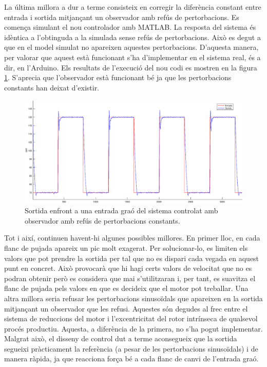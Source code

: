 \documentclass[]{article}
\begin{document}
La última millora a dur a terme consisteix en corregir la diferència constant entre entrada i sortida mitjançant un observador amb refús de pertorbacions. Es comença simulant el nou controlador amb MATLAB. La resposta del sistema és idèntica a l'obtinguda a la simulada sense refús de pertorbacions. Això es degut a que en el model simulat no apareixen aquestes pertorbacions. D'aquesta manera, per valorar que aquest està funcionant s'ha d'implementar en el sistema real, és a dir, en l'Arduino. Els resultats de l'execució del nou codi es mostren en la figura \ref{fig:observador_pertorbacions}. S'aprecia que l'observador està funcionant bé ja que les pertorbacions constants han deixat d'existir. 

\begin{figure}[H]
\centering
	\includegraphics[width = .8\linewidth]{images/Entrada_Sortida_Refus_Constant.eps}
	\caption{Sortida enfront a una entrada graó del sistema controlat amb observador amb refús de pertorbacions constants.}
	\label{fig:observador_pertorbacions}
\end{figure}

Tot i així, continuen havent-hi algunes possibles millores. En primer lloc, en cada flanc de pujada apareix un pic molt exagerat. Per solucionar-lo, es limiten els valors que pot prendre la sortida per tal que no es dispari cada vegada en aquest punt en concret. Això provocarà que hi hagi certs valors de velocitat que no es podran obtenir però es considera que mai s'utilitzaran i, per tant, es suavitza el flanc de pujada pels valors en que es decideix que el motor pot treballar. Una altra millora seria refusar les pertorbacions sinusoïdals que apareixen en la sortida mitjançant un observador que les refusi. Aquestes són degudes al frec entre el sistema de reduccions del motor i l'excentricitat del rotor intrínseca de qualsevol procés productiu. Aquesta, a diferència de la primera, no s'ha pogut implementar. Malgrat això, el disseny de control dut a terme aconsegueix que la sortida segueixi pràcticament la referència (a pesar de les pertorbacions sinusoïdals) i de manera ràpida, ja que reacciona força bé a cada flanc de canvi de l'entrada graó.
\end{document}

